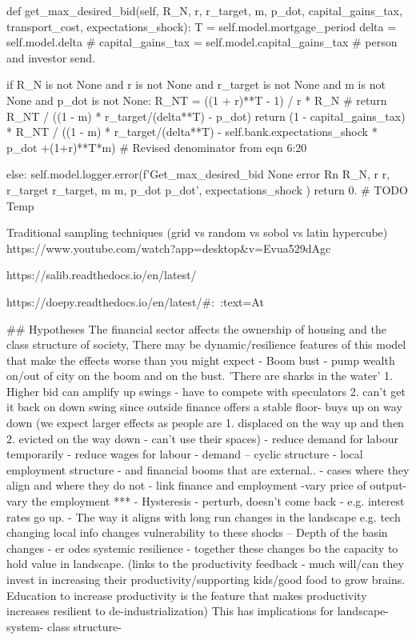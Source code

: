     def get_max_desired_bid(self, R_N, r, r_target, m, p_dot, capital_gains_tax, transport_cost, expectations_shock):
        T      = self.model.mortgage_period
        delta  = self.model.delta
        # capital_gains_tax = self.model.capital_gains_tax # person and investor send.

        if R_N is not None and r is not None and r_target is not None and m is not None and p_dot is not None:
            R_NT   = ((1 + r)**T - 1) / r * R_N
            # return R_NT / ((1 - m) * r_target/(delta**T) - p_dot) 
            return (1 - capital_gains_tax) * R_NT / ((1 - m) * r_target/(delta**T) - self.bank.expectations_shock * p_dot +(1+r)**T*m) # Revised denominator from eqn 6:20

        else:
            self.model.logger.error(f'Get_max_desired_bid None error Rn {R_N}, r {r}, r_target {r_target}, m {m}, p_dot {p_dot}', expectations_shock
)
            return 0. # TODO Temp


Traditional sampling techniques (grid vs random vs sobol vs latin hypercube)
https://www.youtube.com/watch?app=desktop&v=Evua529dAgc


https://salib.readthedocs.io/en/latest/

https://doepy.readthedocs.io/en/latest/#:~:text=At%




## Hypotheses
The financial sector affects the ownership of housing and the class structure of society, 
There may be dynamic/resilience features of this model that make the effects worse than you might expect
- Boom bust - pump wealth on/out of city on the boom and on the bust. 'There are sharks in the water' 1. Higher bid can amplify up swings - have to compete with speculators 2. can't get it back on down swing since outside finance offers a stable floor- buys up on way down (we expect larger effects as people are 1. displaced on the way up and then 2. evicted on the way down - can't use their spaces)
  - reduce demand for labour temporarily - reduce wages for labour - demand -- cyclic structure - local employment structure - and financial booms that are external.. - cases where they align and where they do not
  - link finance and employment -vary price of output- vary the employment *** 
- Hysteresis - perturb, doesn't come back - e.g. interest rates go up.
- The way it aligns with long run changes in the landscape e.g. tech changing local info changes vulnerability to these shocks -- Depth of the basin changes - er   odes systemic resilience - together these changes bo the capacity to hold value in landscape. (links to the productivity feedback - much will/can they invest in increasing their productivity/supporting kids/good food to grow brains. Education to increase productivity is the feature that makes productivity increases resilient to de-industrialization)
This has implications for landscape- system- class structure- 

